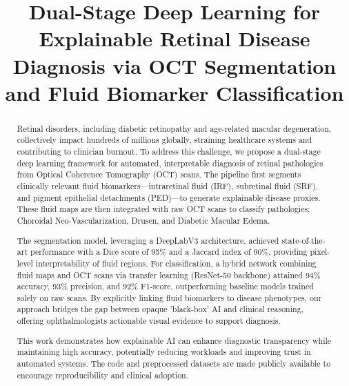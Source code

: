 \documentclass[conference]{IEEEtran}
\begin{document}
\title{Dual-Stage Deep Learning for Explainable Retinal Disease Diagnosis via OCT Segmentation and Fluid Biomarker Classification}

\author{
    \and
    \and

}

\maketitle

\begin{abstract}
Retinal disorders, including diabetic retinopathy and age-related macular degeneration, collectively impact hundreds of millions globally, straining healthcare systems and contributing to clinician burnout. To address this challenge, we propose a dual-stage deep learning framework for automated, interpretable diagnosis of retinal pathologies from Optical Coherence Tomography (OCT) scans. The pipeline first segments clinically relevant fluid biomarkers—intraretinal fluid (IRF), subretinal fluid (SRF), and pigment epithelial detachments (PED)—to generate explainable disease proxies. These fluid maps are then integrated with raw OCT scans to classify pathologies: Choroidal Neo-Vascularization, Drusen, and Diabetic Macular Edema.

The segmentation model, leveraging a DeepLabV3 architecture, achieved state-of-the-art performance with a Dice score of 95\% and a Jaccard index of 90\%, providing pixel-level interpretability of fluid regions. For classification, a hybrid network combining fluid maps and OCT scans via transfer learning (ResNet-50 backbone) attained 94\% accuracy, 93\% precision, and 92\% F1-score, outperforming baseline models trained solely on raw scans. By explicitly linking fluid biomarkers to disease phenotypes, our approach bridges the gap between opaque 'black-box' AI and clinical reasoning, offering ophthalmologists actionable visual evidence to support diagnosis.

This work demonstrates how explainable AI can enhance diagnostic transparency while maintaining high accuracy, potentially reducing workloads and improving trust in automated systems. The code and preprocessed datasets are made publicly available to encourage reproducibility and clinical adoption.
\end{abstract}
\end{document}
